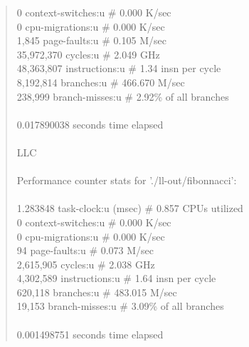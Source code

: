 \documentclass[12pt]{report}
\begin{document}
\begin{quote}
                 0      context-switches:u        \#    0.000 K/sec                \\   
                 0      cpu-migrations:u          \#    0.000 K/sec                \\   
             1,845      page-faults:u             \#    0.105 M/sec                \\   
        35,972,370      cycles:u                  \#    2.049 GHz                  \\   
        48,363,807      instructions:u            \#    1.34  insn per cycle       \\   
         8,192,814      branches:u                \#  466.670 M/sec                \\   
           238,999      branch-misses:u           \#    2.92\% of all branches     \\    
                                                                                   \\ 
       0.017890038 seconds time elapsed                                            \\ 
                                                                                   \\ 
LLC                                                                                     \\ 
                                                                                   \\ 
 Performance counter stats for './ll-out/fibonnacci':                              \\ 
                                                                                   \\ 
          1.283848      task-clock:u (msec)       \#    0.857 CPUs utilized        \\   
                 0      context-switches:u        \#    0.000 K/sec                \\   
                 0      cpu-migrations:u          \#    0.000 K/sec                \\   
                94      page-faults:u             \#    0.073 M/sec                \\   
         2,615,905      cycles:u                  \#    2.038 GHz                  \\   
         4,302,589      instructions:u            \#    1.64  insn per cycle       \\   
           620,118      branches:u                \#  483.015 M/sec                \\   
            19,153      branch-misses:u           \#    3.09\% of all branches     \\    
                                                                                   \\ 
       0.001498751 seconds time elapsed                                            \\ 
\end{quote}
\end{document}

